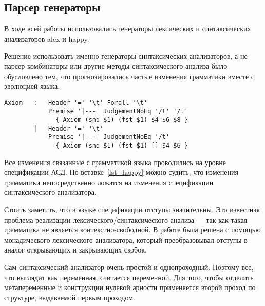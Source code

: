 \subsection{Парсер генераторы}
В ходе всей работы использовались генераторы лексических и синтаксических анализаторов alex\cite{alex} и happy\cite{happy}.

Решение использовать именно генераторы синтаксических анализаторов, а не парсер комбинаторы\cite{parsec} или другие методы синтаксического анализа было обуcловлено тем, что прогнозировались частые изменения грамматики вместе с эволюцией языка.

\begin{lstlisting}[caption={Часть спецификации синтаксического анализатора},captionpos=b, frame=single, label={lst_happy}]
Axiom   :   Header '=' '\t' Forall '\t'
            Premise '|---' JudgementNoEq '/t' '/t'
              { Axiom (snd $1) (fst $1) $4 $6 $8 }
        |   Header '=' '\t'
            Premise '|---' JudgementNoEq '/t'
              { Axiom (snd $1) (fst $1) [] $4 $6 }
\end{lstlisting}

Все изменения связанные с грамматикой языка проводились на уровне спецификации АСД. По вставке~\ref{lst_happy} можно судить, что изменения грамматики непосредственно ложатся на изменения спецификации синтаксического анализатора.

\hfill

Стоить заметить, что в языке спецификации отступы значительны. Это известная проблема реализации лексического/синтаксического анализа --- так как такая грамматика не является контекстно-свободной. В работе была решена с помощью монадического лексического анализатора, который преобразовывал отступы в аналог открывающих и закрывающих скобок.

Сам синтаксический анализатор очень простой и однопроходный. Поэтому все, что выглядит как переменная, считается переменной. Для того, чтобы отделить метапеременные и конструкции нулевой арности применяется второй проход по структуре, выдаваемой первым проходом.

